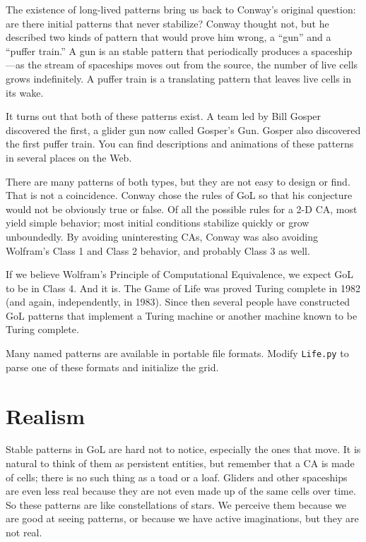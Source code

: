 \documentclass[10pt]{book}
\begin{document}
The existence of long-lived patterns bring us back to Conway's
original question: are there initial patterns that never stabilize?
Conway thought not, but he described two kinds of pattern that would
prove him wrong, a ``gun'' and a ``puffer train.''  A gun is an stable
pattern that periodically produces a spaceship---as the stream of
spaceships moves out from the source, the number of live cells grows
indefinitely.  A puffer train is a translating pattern that leaves
live cells in its wake.

It turns out that both of these patterns exist.  A team led
by Bill Gosper discovered the first, a glider gun now called
Gosper's Gun.  Gosper also discovered the first puffer train.
You can find descriptions and animations of these patterns
in several places on the Web.

There are many patterns of both types, but they are not easy to
design or find.  That is not a coincidence.  Conway chose the
rules of GoL so that his conjecture would not be obviously
true or false.  Of all the possible rules for a 2-D CA, most
yield simple behavior; most initial conditions stabilize quickly
or grow unboundedly.  By avoiding uninteresting CAs, Conway
was also avoiding Wolfram's Class 1 and Class 2 behavior, and
probably Class 3 as well.

If we believe Wolfram's Principle of Computational Equivalence, we
expect GoL to be in Class 4.  And it is.  The Game of Life was proved
Turing complete in 1982 (and again, independently, in 1983).
Since then several people have constructed GoL patterns that implement
a Turing machine or another machine known to be Turing complete.

\begin{ex}

Many named patterns are available in portable file formats.
Modify {\tt Life.py} to parse one of these formats and initialize
the grid.

\end{ex}


\section{Realism}

Stable patterns in GoL are hard not to notice, especially the ones
that move.  It is natural to think of them as persistent entities, but
remember that a CA is made of cells; there is no such thing as a toad
or a loaf.  Gliders and other spaceships are even less real because
they are not even made up of the same cells over time.  So these
patterns are like constellations of stars.  We perceive them because
we are good at seeing patterns, or because we have active
imaginations, but they are not real.
\end{document}
